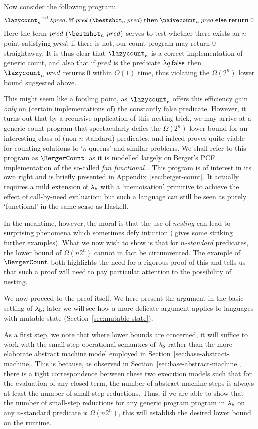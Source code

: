 \documentclass[12pt,phd,lfcs,twoside,openright,logo,leftchapter,normalheadings]{infthesis}
\theoremstyle{plain}
\theoremstyle{definition}
\begin{document}
Now consider the following program:
%
{\small
\[
  \lazycount_n \defas \lambda pred.\; \If \; pred~(\bestshot_n\;pred)\; \Then\; \naivecount_n\;pred\; \Else\; \Return\;0
\]}%
%
Here the term $pred~(\bestshot_n~pred)$ serves to test whether there
exists an $n$-point satisfying $pred$: if there is not, our count
program may return $0$ straightaway.  It is thus clear that
$\lazycount_n$ is a correct implementation of generic count, and also
that if $pred$ is the predicate $\lambda q.\mathsf{false}$ then
$\lazycount_n\;pred$ returns $0$ within $O(1)$ time, thus violating
the $\Omega(2^n)$ lower bound suggested above.

This might seem like a footling point, as $\lazycount_n$ offers this
efficiency gain \emph{only} on (certain implementations of) the
constantly false predicate.  However, it turns out that by a recursive
application of this nesting trick, we may arrive at a generic count
program that spectacularly defies the $\Omega(2^n)$ lower bound for an
interesting class of (non-$n$-standard) predicates, and indeed proves
quite viable for counting solutions to `$n$-queens' and similar
problems.  We shall refer to this program as $\BergerCount$, as it is
modelled largely on Berger's PCF implementation of the so-called
\emph{fan functional}~\citep{Berger90, LongleyN15}. This program is of
interest in its own right and is briefly presented in
Appendix~\ref{sec:berger-count}. It actually requires a mild
extension of $\lambda_{\mathsf{b}}$ with a `memoisation' primitive to achieve the
effect of call-by-need evaluation; but such a language can still be
seen as purely `functional' in the same sense as Haskell.

In the meantime, however, the moral is that the use of \emph{nesting}
can lead to surprising phenomena which sometimes defy intuition
(\citet{Escardo07} gives some striking further examples). What we now
wish to show is that for \emph{$n$-standard} predicates, the \naive
lower bound of $\Omega(n2^n)$ cannot in fact be circumvented. The
example of $\BergerCount$ both highlights the need for a rigorous
proof of this and tells us that such a proof will need to pay
particular attention to the possibility of nesting.

We now proceed to the proof itself. We here present the argument in
the basic setting of $\lambda_{\mathsf{b}}$; later we will see how a more delicate
argument applies to languages with mutable state
(Section~\ref{sec:mutable-state}).

As a first step, we note that where lower bounds are concerned, it
will suffice to work with the small-step operational semantics of
$\lambda_{\mathsf{b}}$ rather than the more elaborate abstract machine model
employed in Section~\ref{sec:base-abstract-machine}. This is because,
as observed in Section~\ref{sec:base-abstract-machine}, there is a
tight correspondence between these two execution models such that for
the evaluation of any closed term, the number of abstract machine
steps is always at least the number of small-step reductions.  Thus,
if we are able to show that the number of small-step reductions for
any generic program program in $\lambda_{\mathsf{b}}$ on any $n$-standard predicate
is $\Omega(n2^n)$, this will establish the desired lower bound on the
runtime.
\end{document}
